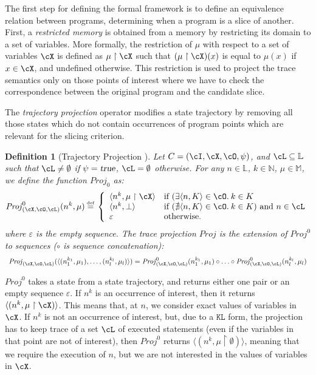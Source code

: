 \documentclass[prodmode,acmtocl]{acmsmall}
\def\memory{\ensuremath{\mu}\xspace}
\def\memories{\ensuremath{\mathbb{M}}\xspace}
\def\lnums{\ensuremath{\mathbb{L}}\xspace}
\def\crit{\ensuremath{C}\xspace}
\def\KL{\ensuremath{\mathtt{KL}}\xspace}
\newcommand{\MEM}[2]{#1 \upharpoonright #2}
\def\Proj{\ensuremath{\mathit{Proj}}\xspace}
\def\defi{\mbox{\raisebox{0ex}[1ex][1ex]{$\stackrel{\mbox{\tiny
def}}{\; =\;}$}}}
\newcommand{\true}{\mbox{\sl true}}
\def\tuple#1{\langle #1 \rangle}
\newcommand{\0}{\mbox{\bf 0}}
\newtheorem{mydefinition}[theorem]{Definition}
\def\NATURALS{\mathbb{N}}
\begin{document}
The first step for defining the formal framework is to define an
equivalence relation between programs, determining when a program is a
slice of another.  First, a \emph{restricted memory} is obtained from
a memory by restricting its domain to a set of variables.  More
formally, the restriction of $\memory$ with respect to a set of
variables $\cX$ is defined as $\MEM{\memory}{\cX}$ such that
$(\MEM{\memory}{\cX})(x)$ is equal to $\memory(x)$ if $x\in \cX$, and
undefined otherwise.  This restriction is used to project the trace
semantics only on those points of interest where we have to check the
correspondence between the original program and the candidate slice.

The \emph{trajectory projection} operator modifies a state trajectory
by removing all those states which do not contain occurrences of
program points which are relevant for the slicing criterion.

\begin{mydefinition}[Trajectory Projection \cite{AForm}]
  \label{def:Proj}
  Let $\crit=(\cI,\cX,\cO,\psi)$, and $\cL\subseteq\lnums$ such that $\cL\neq\emptyset$ if $\psi=\true$, $\cL=\emptyset$ otherwise. For any $n \in \lnums$, $k \in \NATURALS$, $\memory \in \memories$, we define the function $\Proj_0$ as:
  \[ \Proj^0_{(\cX,\cO,\cL)}(n^k,\memory) \defi \left\{
  \begin{array}{ll}
    \tuple{n^k, \MEM{\memory}{\cX}} & \mbox{if }(\exists \tuple{n,K} \in \cO.\:k \in K \\ \tuple{n^k,\bot}
      & \mbox{if }(\nexists \tuple{n,K} \in \cO.\:k \in K)\mbox{ and }n\in\cL \\ \varepsilon & \mbox{otherwise}.
  \end{array}
  \right.
  \]
  where $\varepsilon$ is the empty sequence.  The trace projection $\Proj$
  is the extension of $\Proj^0$ to sequences ($\circ$ is sequence
  concatenation):
  \[ \begin{array}{rl}
    \Proj_{(\cX,\cO,\cL)} (\tuple{(n^{k_1}_1, \memory_1), \ldots, 
      (n^{k_l}_l, \memory_l)})  =
     \Proj^0_{(\cX,\cO,\cL)}(n^{k_1}_1, \memory_1) \circ
      \ldots \circ \Proj^0_{(\cX,\cO,\cL)}(n^{k_l}_l, \memory_l)
  \end{array}
  \]
\end{mydefinition}

\noindent $\Proj^0$ takes a state from a state trajectory, and returns
either one pair or an empty sequence $\varepsilon$.  If
$n^k$ is an occurrence of interest, then it returns
$\tuple{(n^k, \MEM{\memory}{\cX})}$.  This means that, at $n$, we
consider exact values of variables in $\cX$.  If $n^k$ is not an
occurrence of interest, but, due
to a $\KL$ form, the projection has to keep trace of a set $\cL$ of executed statements (even if the variables in that point are not of interest), then $\Proj^0$ returns
$\tuple{(n^k, \MEM{\memory}{\emptyset})}$, meaning that we require
the execution of $n$, but we are not interested in the values of
variables in $\cX$.
\end{document}
